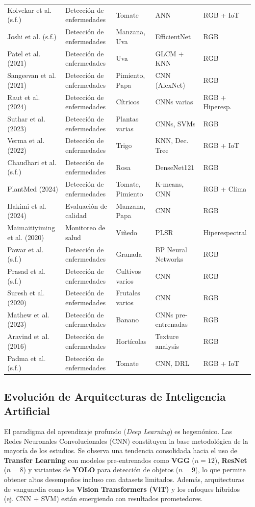 \documentclass[agriculture,article,submit,pdftex,moreauthors]{Definitions/mdpi}
\begin{document}
\begin{footnotesize}
\begin{longtable}{p{3cm} p{2cm} p{2cm} p{2.8cm} p{2cm}}
Kolvekar et al. (s.f.) & Detección de enfermedades & Tomate & ANN & RGB + IoT \\
Joshi et al. (s.f.) & Detección de enfermedades & Manzana, Uva & EfficientNet & RGB \\
Patel et al. (2021) & Detección de enfermedades & Uva & GLCM + KNN & RGB \\
Sangeevan et al. (2021) & Detección de enfermedades & Pimiento, Papa & CNN (AlexNet) & RGB \\
Raut et al. (2024) & Detección de enfermedades & Cítricos & CNNs varias & RGB + Hiperesp. \\
Suthar et al. (2023) & Detección de enfermedades & Plantas varias & CNNs, SVMs & RGB \\
Verma et al. (2022) & Detección de enfermedades & Trigo & KNN, Dec. Tree & RGB + IoT \\
Chaudhari et al. (s.f.) & Detección de enfermedades & Rosa & DenseNet121 & RGB \\
PlantMed (2024) & Detección de enfermedades & Tomate, Pimiento & K-means, CNN & RGB + Clima \\
Hakimi et al. (2024) & Evaluación de calidad & Manzana, Papa & CNN & RGB \\
Maimaitiyiming et al. (2020) & Monitoreo de salud & Viñedo & PLSR & Hiperespectral \\
Pawar et al. (s.f.) & Detección de enfermedades & Granada & BP Neural Networks & RGB \\
Prasad et al. (s.f.) & Detección de enfermedades & Cultivos varios & CNN & RGB \\
Suresh et al. (2020) & Detección de enfermedades & Frutales varios & CNN & RGB \\
Mathew et al. (2023) & Detección de enfermedades & Banano & CNNs pre-entrenadas & RGB \\
Aravind et al. (2016) & Detección de enfermedades & Hortícolas & Texture analysis & RGB \\
Padma et al. (s.f.) & Detección de enfermedades & Tomate & CNN, DRL & RGB + IoT \\
\end{longtable}
\end{footnotesize}

\subsection{Evolución de Arquitecturas de Inteligencia Artificial}
El paradigma del aprendizaje profundo (\textit{Deep Learning}) es hegemónico. Las Redes Neuronales Convolucionales (CNN) constituyen la base metodológica de la mayoría de los estudios. Se observa una tendencia consolidada hacia el uso de \textbf{Transfer Learning} con modelos pre-entrenados como \textbf{VGG} ($n=12$), \textbf{ResNet} ($n=8$) y variantes de \textbf{YOLO} para detección de objetos ($n=9$), lo que permite obtener altos desempeños incluso con datasets limitados. Además, arquitecturas de vanguardia como los \textbf{Vision Transformers (ViT)} y los enfoques híbridos (ej. CNN + SVM) están emergiendo con resultados prometedores.
\end{document}

